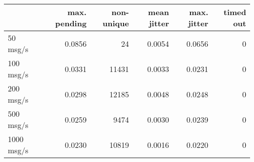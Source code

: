 \begin{tabular}{l|rrrrr}
\rowcolor{gray!50}
 & max. pending & non-unique & mean jitter & max. jitter & timed out\\\hline
50 msg/s & 0.0856 & 24 & 0.0054 & 0.0656 & 0 \\
100 msg/s & 0.0331 & 11431 & 0.0033 & 0.0231 & 0 \\
200 msg/s & 0.0298 & 12185 & 0.0048 & 0.0248 & 0 \\
500 msg/s & 0.0259 & 9474 & 0.0030 & 0.0239 & 0 \\
1000 msg/s & 0.0230 & 10819 & 0.0016 & 0.0220 & 0 \\
\end{tabular}
